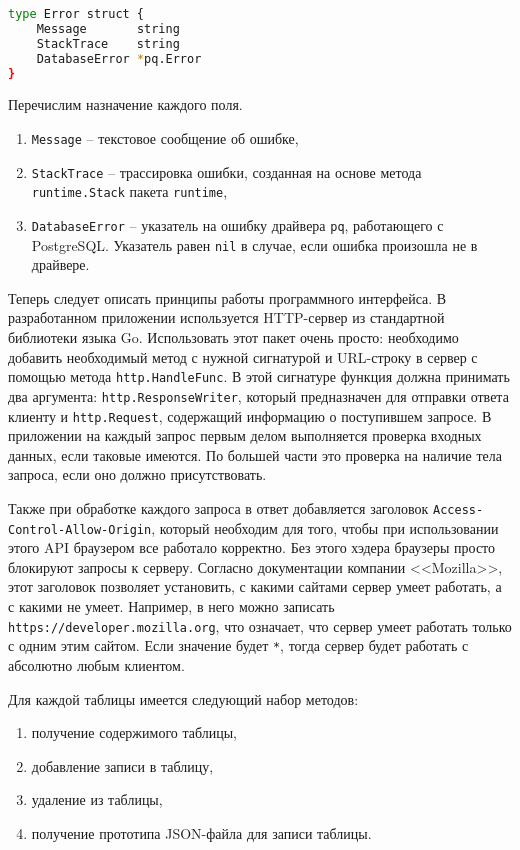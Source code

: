 \begin{lstlisting}[language=bash, caption = {Стурктура Error.}, captionpos=b, label={error}]
type Error struct {
	Message       string
	StackTrace    string
	DatabaseError *pq.Error
}
\end{lstlisting}

Перечислим назначение каждого поля.

\begin{enumerate}
	\item \texttt{Message} -- текстовое сообщение об ошибке,
	\item \texttt{StackTrace} -- трассировка ошибки, созданная на основе метода \texttt{runtime.Stack} пакета \texttt{runtime},
	\item \texttt{DatabaseError} -- указатель на ошибку драйвера \texttt{pq}, работающего с PostgreSQL. Указатель равен \texttt{nil}
	      в случае, если ошибка произошла не в драйвере.
\end{enumerate}

Теперь следует описать принципы работы программного интерфейса. В разработанном приложении используется HTTP-сервер из стандартной
библиотеки языка Go. Использовать этот пакет очень просто: необходимо добавить необходимый метод с нужной сигнатурой и
URL-строку в сервер с помощью метода \texttt{http.HandleFunc}. В этой сигнатуре функция должна принимать два аргумента:
\texttt{http.ResponseWriter}, который предназначен для отправки ответа клиенту и \texttt{http.Request}, содержащий информацию
о поступившем запросе. В приложении на каждый запрос первым делом выполняется проверка входных данных, если таковые имеются.
По большей части это проверка на наличие тела запроса, если оно должно присутствовать.

Также при обработке каждого запроса в ответ добавляется заголовок \texttt{Access-Control-Allow-Origin}, который необходим
для того, чтобы при использовании этого API браузером все работало корректно. Без этого хэдера браузеры просто блокируют запросы
к серверу. Согласно документации компании <<Mozilla>>\cite{Access-Control-Allow-Origin}, этот заголовок позволяет
установить, с какими сайтами сервер умеет работать, а с какими не умеет. Например, в него можно записать \texttt{https://developer.mozilla.org},
что означает, что сервер умеет работать только с одним этим сайтом. Если значение будет \texttt{*}, тогда сервер будет работать с абсолютно
любым клиентом.

Для каждой таблицы имеется следующий набор методов:

\begin{enumerate}
	\item получение содержимого таблицы,
	\item добавление записи в таблицу,
	\item удаление из таблицы,
	\item получение прототипа JSON-файла для записи таблицы.
\end{enumerate}

